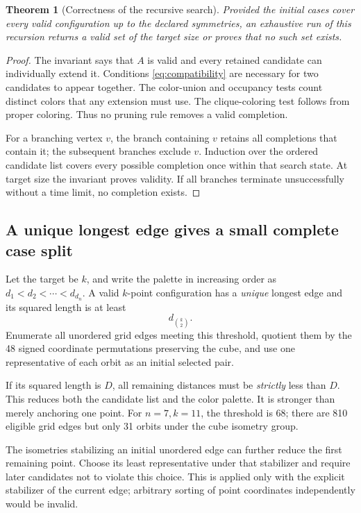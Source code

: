 \documentclass[11pt,letterpaper]{article}
\newtheorem{theorem}{Theorem}[section]
\theoremstyle{definition}
\begin{document}
\begin{theorem}[Correctness of the recursive search]
\label{thm:search-correct}
Provided the initial cases cover every valid configuration up to the
declared symmetries, an exhaustive run of this recursion returns a valid
set of the target size or proves that no such set exists.
\end{theorem}
\begin{proof}
The invariant says that \(A\) is valid and every retained candidate
can individually extend it. Conditions \cref{eq:compatibility} are
necessary for two candidates to appear together. The color-union and
occupancy tests count distinct colors that any extension must use.
The clique-coloring test follows from proper coloring.
Thus no pruning rule removes a valid completion.

For a branching vertex \(v\), the branch containing \(v\) retains all
completions that contain it; the subsequent branches exclude \(v\).
Induction over the ordered candidate list covers every possible
completion once within that search state. At target size the invariant
proves validity. If all branches terminate unsuccessfully without a
time limit, no completion exists.
\end{proof}

\subsection{A unique longest edge gives a small complete case split}
\label{sec:diameter}
Let the target be \(k\), and write the palette in increasing order as
\(d_1<d_2<\cdots<d_{d_n}\). A valid \(k\)-point configuration has a
\emph{unique} longest edge and its squared length is at least
\[
 d_{\binom{k}{2}}.
\]
Enumerate all unordered grid edges meeting this threshold, quotient them
by the 48 signed coordinate permutations preserving the cube, and use
one representative of each orbit as an initial selected pair.

If its squared length is \(D\), all remaining distances must be
\emph{strictly} less than \(D\). This reduces both the candidate list
and the color palette. It is stronger than merely anchoring one point.
For \(n=7,k=11\), the threshold is 68; there are 810 eligible grid edges
but only 31 orbits under the cube isometry group.

The isometries stabilizing an initial unordered edge can further reduce
the first remaining point. Choose its least representative under that
stabilizer and require later candidates not to violate this choice.
This is applied only with the explicit stabilizer of the current edge;
arbitrary sorting of point coordinates independently would be invalid.
\end{document}
